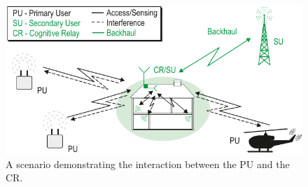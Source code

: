 
\begin{figure}[htb]
	\centering
		\includegraphics[width = \columnwidth]{../kapitel02/figures/wo_channels_CR_Scenario_farbig_general}
	\caption{A scenario demonstrating the interaction between the PU and the CR.}
	\label{fig:dsp_market_share}
\end{figure}

